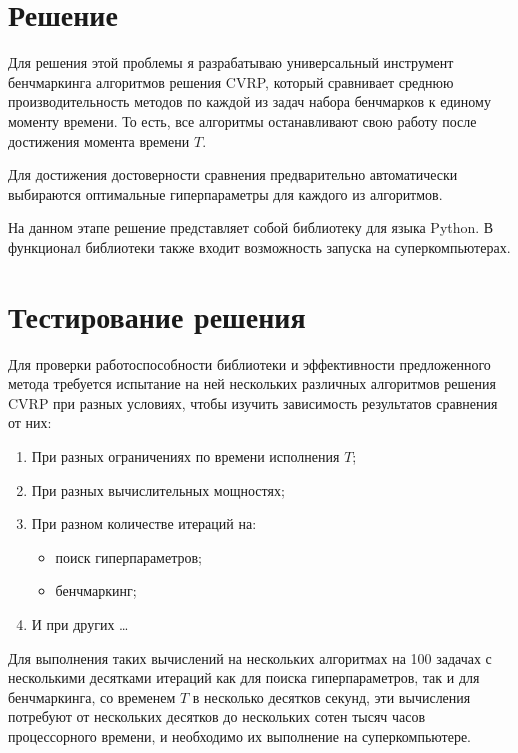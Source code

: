 \documentclass[a4paper,12pt]{article}
\begin{document}
\section*{Решение}
Для решения этой проблемы я разрабатываю универсальный
инструмент бенчмаркинга алгоритмов решения CVRP, который
сравнивает среднюю производительность методов по каждой
из задач набора бенчмарков к единому моменту времени.
То есть, все алгоритмы останавливают свою работу после
достижения момента времени $T$.

Для достижения достоверности сравнения предварительно
автоматически выбираются оптимальные гиперпараметры для
каждого из алгоритмов.

На данном этапе решение представляет собой библиотеку
для языка Python. В функционал библиотеки также входит
возможность запуска на суперкомпьютерах.

\section*{Тестирование решения}
Для проверки работоспособности библиотеки и эффективности
предложенного метода требуется испытание на ней нескольких
различных алгоритмов решения CVRP при разных условиях,
чтобы изучить зависимость результатов сравнения от них:

\begin{enumerate}
    \item При разных ограничениях по времени исполнения $T$;
    \item При разных вычислительных мощностях;
    \item При разном количестве итераций на:
    \begin{itemize}
        \item поиск гиперпараметров;
        \item бенчмаркинг;
    \end{itemize}
    \item[] И при других \dots
\end{enumerate}

Для выполнения таких вычислений на нескольких алгоритмах на
100 задачах с несколькими десятками итераций как для поиска
гиперпараметров, так и для бенчмаркинга, со временем $T$ в
несколько десятков секунд, эти вычисления потребуют от 
нескольких десятков до нескольких сотен тысяч часов 
процессорного времени, и необходимо их выполнение на 
суперкомпьютере.

\printbibliography
\end{document}
